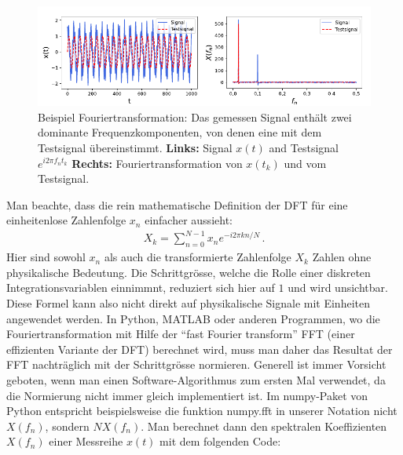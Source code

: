 \begin{figure}[htbp]
    \centering
        \includegraphics[width=\textwidth]{Figures/psd_fig1.pdf}
        \caption{Beispiel Fouriertransformation: Das gemessen Signal enthält zwei dominante Frequenzkomponenten, von denen eine mit dem Testsignal übereinstimmt. \textbf{Links:} Signal $x(t)$ and Testsignal $e^{i2\pi f_n t_k}$ \textbf{Rechts:} Fouriertransformation von $x(t_k)$ und vom Testsignal.}
        \label{fig:fouriertransformation}
\end{figure}
Man beachte, dass die rein mathematische Definition der DFT für eine einheitenlose Zahlenfolge $x_n$ einfacher aussieht:
\begin{align}
X_k = \sum_{n=0}^{N-1} x_n e^{-i 2 \pi k n/N}\,.
\label{eq:vl7-1c}
\end{align}
Hier sind sowohl $x_n$ als auch die transformierte Zahlenfolge $X_k$ Zahlen ohne physikalische Bedeutung. Die Schrittgrösse, welche die Rolle einer diskreten Integrationsvariablen einnimmnt, reduziert sich hier auf $1$ und wird unsichtbar. Diese Formel kann also nicht direkt auf physikalische Signale mit Einheiten angewendet werden. In Python, MATLAB oder anderen Programmen, wo die Fouriertransformation mit Hilfe der ``fast Fourier transform'' FFT (einer effizienten Variante der DFT) berechnet wird, muss man daher das Resultat der FFT nachträglich mit der Schrittgrösse normieren. Generell ist immer Vorsicht geboten, wenn man einen Software-Algorithmus zum ersten Mal verwendet, da die Normierung nicht immer gleich implementiert ist. Im numpy-Paket von Python entspricht beispielsweise die funktion numpy.fft in unserer Notation nicht $X(f_n)$, sondern $NX(f_n)$. Man berechnet dann den spektralen Koeffizienten $X(f_n)$ einer Messreihe $x(t)$ mit dem folgenden Code: 
